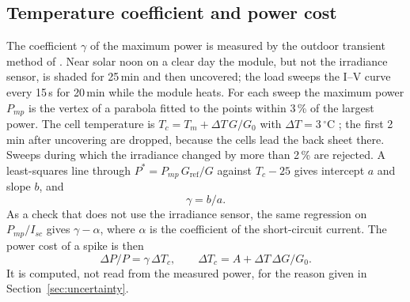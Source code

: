 \documentclass[conference]{IEEEtran}
\newcommand{\degC}{\ensuremath{^\circ}C}
\begin{document}
\subsection{Temperature coefficient and power cost}\label{sec:gamma}
The coefficient $\gamma$ of the maximum power is measured by the outdoor transient
method of \cite{king1997}. Near solar noon on a clear day the module, but not the
irradiance sensor, is shaded for 25\,min and then uncovered; the load sweeps the I--V
curve every 15\,s for 20\,min while the module heats. For each sweep the maximum power
$P_{mp}$ is the vertex of a parabola fitted to the points within 3\,\% of the largest
power. The cell temperature is $T_c=T_m+\Delta T\,G/G_0$ with $\Delta T=3$\,\degC{}
\cite{king2004}; the first 2\,min after uncovering are dropped, because the cells lead
the back sheet there. Sweeps during which the irradiance changed by more than 2\,\% are
rejected. A least-squares line through
$P^*=P_{mp}\,G_\mathrm{ref}/G$ against $T_c-25$ gives intercept $a$ and slope $b$, and
\begin{equation}
\gamma = b/a .
\end{equation}
As a check that does not use the irradiance sensor, the same regression on
$P_{mp}/I_{sc}$ gives $\gamma-\alpha$, where $\alpha$ is the coefficient of the
short-circuit current. The power cost of a spike is then
\begin{equation}
\Delta P/P = \gamma\,\Delta T_c,\qquad
\Delta T_c = A + \Delta T\,\Delta G/G_0 .
\end{equation}
It is computed, not read from the measured power, for the reason given in Section~\ref{sec:uncertainty}.
\end{document}
